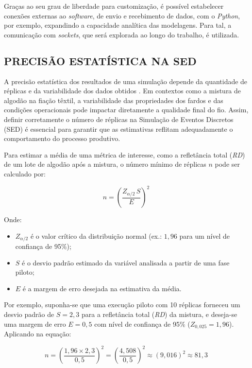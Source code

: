 \documentclass[
    12pt,                %
    openright,           %
    oneside,             %
    a4paper,             %
    english,             %
    spanish,             %
    brazil               %
]{ufscar}
\begin{document}
Graças ao seu grau de liberdade para customização, é possível estabelecer conexões externas ao \textit{software}, de envio e recebimento de dados, com o \textit{Python}, por exemplo, expandindo a capacidade analítica das modelagens. Para tal, a comunicação com \textit{sockets}, que será explorada ao longo do trabalho, é utilizada.

\subsection{PRECISÃO ESTATÍSTICA NA SED}

A precisão estatística dos resultados de uma simulação depende da quantidade de réplicas e da variabilidade dos dados obtidos \cite{banks_discrete-event_2010}. Em contextos como a mistura de algodão na fiação têxtil, a variabilidade das propriedades dos fardos e das condições operacionais pode impactar diretamente a qualidade final do fio. Assim, definir corretamente o número de réplicas na Simulação de Eventos Discretos (SED) é essencial para garantir que as estimativas reflitam adequadamente o comportamento do processo produtivo.

Para estimar a média de uma métrica de interesse, como a refletância total (\textit{RD}) de um lote de algodão após a mistura, o número mínimo de réplicas \(n\) pode ser calculado por:

\begin{equation}
n = \left( \frac{Z_{\alpha/2} \, S}{E} \right)^2
\label{eq:n_replicas}
\end{equation}

Onde:
\begin{itemize}
    \item \(Z_{\alpha/2}\) é o valor crítico da distribuição normal (ex.: \(1{,}96\) para um nível de confiança de 95\%);
    \item \(S\) é o desvio padrão estimado da variável analisada a partir de uma fase piloto;
    \item \(E\) é a margem de erro desejada na estimativa da média.
\end{itemize}

Por exemplo, suponha-se que uma execução piloto com 10 réplicas forneceu um desvio padrão de \(S = 2{,}3\) para a refletância total (\textit{RD}) da mistura, e deseja-se uma margem de erro \(E = 0{,}5\) com nível de confiança de 95\% (\(Z_{0,025} = 1{,}96\)). Aplicando na equação:

\begin{equation}
n = \left( \frac{1{,}96 \times 2{,}3}{0{,}5} \right)^2 = \left( \frac{4{,}508}{0{,}5} \right)^2 \approx (9{,}016)^2 \approx 81{,}3
\end{equation}
\end{document}
